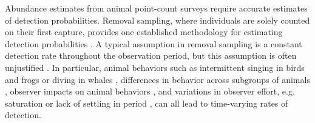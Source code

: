 \documentclass[12pt]{article}
\begin{document}
Abundance estimates from animal point-count surveys require accurate estimates of detection probabilities.  
Removal sampling, where individuals are solely counted on their first capture, provides one established methodology for estimating detection probabilities \citep{Farnsworth2002}.
A typical assumption in removal sampling is a constant detection rate throughout the observation period, but this assumption is often unjustified \citep{Alldredge2007}.  
In particular, animal behaviors such as intermittent singing in birds and frogs or diving in whales \citep{Scott2005, Diefenbach2007, Reidy2011}, differences in behavior across subgroups of animals \citep{Otis1978, Farnsworth2005}, observer impacts on animal behaviors \citep{McSheaRappole1997, Rosenstock2002, Alldredge2007}, and variations in observer effort, e.g. saturation or lack of settling in period \citep{Petit1995, LeeMarsden2008, Johnson2008}, can all lead to time-varying rates of detection.
\end{document}
